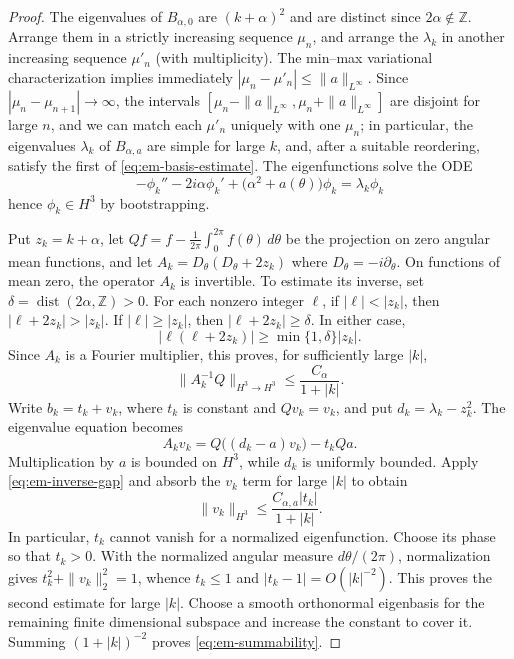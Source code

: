 \documentclass[11pt,a4paper,reqno,backref=page]{amsart}
\newcommand{\Z}{\mathbb Z}
\numberwithin{equation}{section}
\theoremstyle{definition}
\theoremstyle{remark}
\begin{document}
\begin{proof}
  The eigenvalues of $B_{\alpha,0}$ are $(k+\alpha)^2$
  and are distinct since $2 \alpha\not\in \mathbb{Z}$.
  Arrange them in a strictly increasing sequence $\mu_{n}$,
  and arrange the $\lambda_{k}$ in another increasing sequence
  $\mu'_{n}$ (with multiplicity).
  The min--max variational characterization implies immediately
  $|\mu_{n}-\mu'_{n}|\le\|a\|_{L^{\infty}}$.
  Since $|\mu_{n}-\mu_{n+1}|\to \infty$, the intervals
  $[\mu_{n}-\|a\|_{L^{\infty}},\mu_{n}+\|a\|_{L^{\infty}}]$
  are disjoint for large $n$, and we can match each $\mu'_{n}$ 
  uniquely
  with one $\mu_{n}$; in particular, the eigenvalues $\lambda_{k}$
  of $B_{\alpha,a}$ are simple for large $k$, and, after
  a suitable reordering, satisfy the first of 
  \eqref{eq:em-basis-estimate}.
  The eigenfunctions solve the ODE
  $$-\phi_k''-2i\alpha\phi_k' +\bigl(\alpha^2+a(\theta)\bigr)\phi_k
    =\lambda_k\phi_k$$
  hence $\phi_{k}\in H^{3}$ by bootstrapping.

  Put $z_k=k+\alpha$, let
  $Qf=f-\frac1{2\pi}\int_0^{2\pi}f(\theta)\,d\theta$
  be the projection on zero angular mean functions,
  and let $A_k=D_\theta(D_\theta+2z_k)$ where 
  $D_{\theta}=-i \partial_{\theta}$.
  On functions of mean zero, the operator
  $A_k$ is invertible. To estimate
  its inverse, set $\delta=\operatorname{dist}(2\alpha,\Z)>0$.
  For each nonzero integer $\ell$, if $|\ell|<|z_k|$, then
  $|\ell+2z_k|>|z_k|$. If $|\ell|\ge|z_k|$, then
  $|\ell+2z_k|\ge\delta$. In either case,
  \begin{equation*}
    |\ell(\ell+2z_k)|\ge\min\{1,\delta\}|z_k|.
  \end{equation*}
  Since $A_k$ is a Fourier multiplier, this proves, for
  sufficiently large $|k|$,
  \begin{equation}\label{eq:em-inverse-gap}
    \|A_k^{-1}Q\|_{H^3\to H^3}
    \le\frac{C_\alpha}{1+|k|}.
  \end{equation}
  Write $b_k=t_k+v_k$, where $t_k$ is constant and $Qv_k=v_k$,
  and put $d_k=\lambda_k-z_k^2$. The eigenvalue equation
  becomes
  \begin{equation*}
    A_kv_k=Q\bigl((d_k-a)v_k\bigr)-t_kQa.
  \end{equation*}
  Multiplication by $a$ is bounded on $H^3$, while $d_k$ is
  uniformly bounded. Apply \eqref{eq:em-inverse-gap} and
  absorb the $v_k$ term for large $|k|$ to obtain
  \begin{equation*}
    \|v_k\|_{H^3}\le\frac{C_{\alpha,a}|t_k|}{1+|k|}.
  \end{equation*}
  In particular, $t_k$ cannot vanish for a normalized
  eigenfunction. Choose its phase so that $t_k>0$. With the
  normalized angular measure $d\theta/(2\pi)$, normalization
  gives $t_k^2+\|v_k\|_2^2=1$, whence $t_k\le1$ and
  $|t_k-1|=O(|k|^{-2})$. This proves the second estimate for
  large $|k|$. Choose a smooth orthonormal eigenbasis for the
  remaining finite dimensional subspace and increase the
  constant to cover it. Summing $(1+|k|)^{-2}$ proves
  \eqref{eq:em-summability}.
\end{proof}
\end{document}
